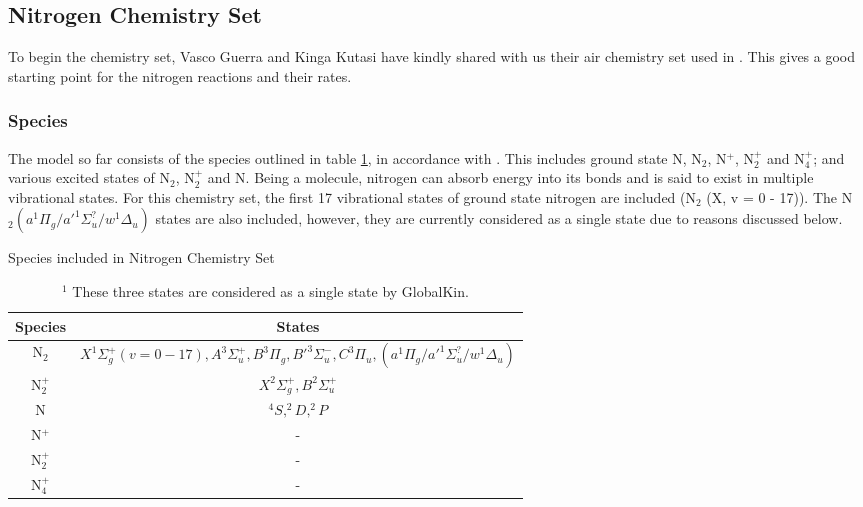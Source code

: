 \documentclass[11pt, oneside]{article}   	%
\begin{document}
\subsection{Nitrogen Chemistry Set}
To begin the chemistry set, Vasco Guerra and Kinga Kutasi have kindly shared with us their air chemistry set used in \cite{Kutasi2016tuning}.
This gives a good starting point for the nitrogen reactions and their rates.

\subsubsection{Species}

The model so far consists of the species outlined in table \ref{table:Species}, in accordance with \cite{Kutasi2016tuning}.
This includes ground state N, N$_2$, N$^+$, N$_2^+$ and N$_4^+$; and various excited states of N$_2$, N$_2^+$ and N.
Being a molecule, nitrogen can absorb energy into its bonds and is said to exist in multiple vibrational states.
For this chemistry set, the first 17 vibrational states of ground state nitrogen are included (N$_2$ (X, v = 0 - 17)).
The N$_2 (a^1\Pi_g/a'^1\Sigma^?_u/w^1\Delta_u)$ states are also included, however, they are currently considered as a single state due to reasons discussed below.



\begin{table}
\caption{Species included in Nitrogen Chemistry Set}
\begin{center}
\begin{tabular}{| c | c |}
\hline
Species & States \\
\hline\hline \hline
N$_2$ & $X^1\Sigma_g^+  (v = 0 - 17),  A^3\Sigma_u^+, B^3\Pi_g, B'^3\Sigma_u^-, C^3\Pi_u, (a^1\Pi_g/a'^1\Sigma^?_u/w^1\Delta_u)$\footnotemark  \\
\hline
N$_2^+$ & $X^2\Sigma_g^+, B^2\Sigma_u^+ $ \\
\hline
N & $^4S, ^2D,  ^2P$ \\
\hline
N$^+$ & - \\
\hline
N$_2^+$ & - \\
\hline
N$_4^+$ & - \\
\hline
\end{tabular}
\end{center}
\label{table:Species}
\caption*{$^1$ These three states are considered as a single state by GlobalKin.}
\end{table}
\end{document}
